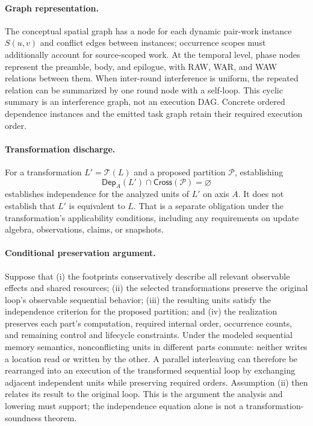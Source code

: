 \paragraph{Graph representation.}
The conceptual spatial graph has a node for each dynamic pair-work
instance $S(u,v)$ and conflict edges between instances; occurrence scopes
must additionally account for source-scoped work. At the temporal level,
phase nodes represent the preamble, body, and epilogue, with RAW, WAR,
and WAW relations between them. When inter-round interference is uniform,
the repeated relation can be summarized by one round node with a
self-loop. This cyclic summary is an interference graph, not an
execution DAG. Concrete ordered dependence instances and the emitted
task graph retain their required execution order.

\paragraph{Transformation discharge.}
For a transformation $L'=\mathcal T(L)$ and a proposed partition
$\mathcal P$, establishing
\[
\mathsf{Dep}_A(L')\cap\mathsf{Cross}(\mathcal P)=\varnothing
\]
establishes independence for the analyzed units of $L'$ on axis $A$.
It does not establish that $L'$ is equivalent to $L$. That is a separate
obligation under the transformation's applicability conditions, including
any requirements on update algebra, observations, claims, or snapshots.

\paragraph{Conditional preservation argument.}
Suppose that (i) the footprints conservatively describe all relevant
observable effects and shared resources; (ii) the selected transformations
preserve the original loop's observable sequential behavior; (iii) the
resulting units satisfy the independence criterion for the proposed
partition; and (iv) the realization preserves each part's computation,
required internal order, occurrence counts, and remaining control and
lifecycle constraints. Under the modeled sequential memory semantics,
nonconflicting units in different parts commute: neither writes a
location read or written by the other. A parallel interleaving can
therefore be rearranged into an execution of the transformed sequential
loop by exchanging adjacent independent units while preserving required
orders. Assumption (ii) then relates its result to the original loop.
This is the argument the analysis and lowering must support; the
independence equation alone is not a transformation-soundness theorem.

